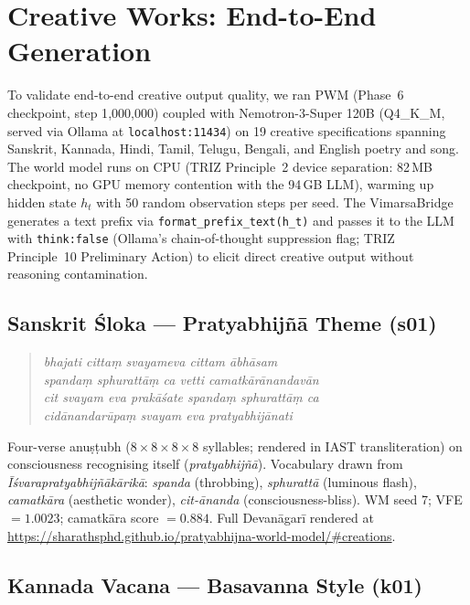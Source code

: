 \documentclass[journal,onecolumn,11pt]{IEEEtran}
\begin{document}
\section{Creative Works: End-to-End Generation}\label{sec:creations}

To validate end-to-end creative output quality, we ran PWM (Phase~6 checkpoint,
step 1{,}000{,}000) coupled with Nemotron-3-Super 120B (Q4\_K\_M, served via
Ollama at \texttt{localhost:11434}) on 19 creative specifications spanning
Sanskrit, Kannada, Hindi, Tamil, Telugu, Bengali, and English poetry and song.
The world model runs on CPU (TRIZ Principle~2 device separation: 82\,MB checkpoint,
no GPU memory contention with the 94\,GB LLM), warming up hidden state $h_t$
with 50 random observation steps per seed.
The VimarsaBridge generates a text prefix via \texttt{format\_prefix\_text(h\_t)}
and passes it to the LLM with \texttt{think:false} (Ollama's chain-of-thought
suppression flag; TRIZ Principle~10 Preliminary Action) to elicit direct
creative output without reasoning contamination.

\subsection{Sanskrit Śloka --- Pratyabhijñā Theme (s01)}\label{sec:s01}

\begin{quote}
\small\itshape
bhajati cittaṃ svayameva cittam ābhāsam \textbar \\
spandaṃ sphurattāṃ ca vetti camatkārānandavān \textbar \\
cit svayam eva prakāśate spandaṃ sphurattāṃ ca \textbar \\
cidānandarūpaṃ svayam eva pratyabhijānati \textbar\textbar
\end{quote}

Four-verse anuṣṭubh ($8{\times}8{\times}8{\times}8$ syllables; rendered in IAST
transliteration) on consciousness recognising itself (\emph{pratyabhijñā}).
Vocabulary drawn from \emph{Īśvarapratyabhijñākārikā}:
\emph{spanda} (throbbing), \emph{sphurattā} (luminous flash), \emph{camatkāra}
(aesthetic wonder), \emph{cit-ānanda} (consciousness-bliss).
WM seed 7; VFE $= 1.0023$; camatkāra score $= 0.884$.
Full Devanāgarī rendered at \url{https://sharathsphd.github.io/pratyabhijna-world-model/#creations}.

\subsection{Kannada Vacana --- Basavanna Style (k01)}\label{sec:k01}
\end{document}
